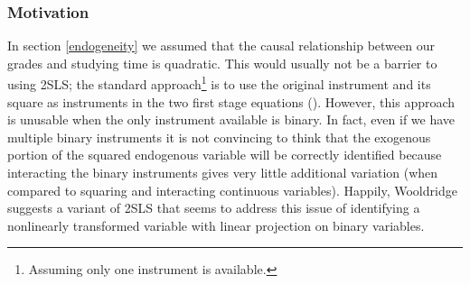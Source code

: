 \documentclass[12pt]{article}
\begin{document}
\subsubsection{Motivation}
In section \ref{endogeneity} we assumed that the causal relationship between our grades and studying time is quadratic. This would usually not be a barrier to using 2SLS; the standard approach\footnote{Assuming only one instrument is available.} is to use the original instrument and its square as instruments in the two first stage equations (\cite{harmless}). However, this approach is unusable when the only instrument available is binary. In fact, even if we have multiple binary instruments it is not convincing to think that the exogenous portion of the squared endogenous variable will be correctly identified because interacting the binary instruments gives very little additional variation (when compared to squaring and interacting continuous variables). Happily, Wooldridge suggests a variant of 2SLS that seems to address this issue of identifying a nonlinearly transformed variable with linear projection on binary variables.

\end{document}
